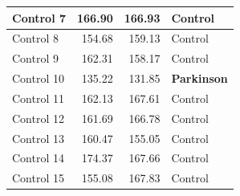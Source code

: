 \documentclass[10pt, conference, compsocconf]{IEEEtran}
\begin{document}
\begin{table}[!h]
\begin{tabular}{|l|l|l|l|}
Control 7         & \multicolumn{1}{r|}{166.90}                                                          & \multicolumn{1}{r|}{166.93}                                                          & Control                                                            \\ \hline
Control 8         & \multicolumn{1}{r|}{154.68}                                                          & \multicolumn{1}{r|}{159.13}                                                          & Control                                                            \\ \hline
Control 9         & \multicolumn{1}{r|}{162.31}                                                          & \multicolumn{1}{r|}{158.17}                                                          & Control                                                            \\ \hline
Control 10         & \multicolumn{1}{r|}{135.22}                                                          & \multicolumn{1}{r|}{131.85}                                                          & \textbf{Parkinson}                                                            \\ \hline
Control 11         & \multicolumn{1}{r|}{162.13}                                                          & \multicolumn{1}{r|}{167.61}                                                          & Control                                                            \\ \hline
Control 12         & \multicolumn{1}{r|}{161.69}                                                          & \multicolumn{1}{r|}{166.78}                                                          & Control                                                            \\ \hline
Control 13         & \multicolumn{1}{r|}{160.47}                                                          & \multicolumn{1}{r|}{155.05}                                                          & Control                                                            \\ \hline
Control 14         & \multicolumn{1}{r|}{174.37}                                                          & \multicolumn{1}{r|}{167.66}                                                          & Control                                                            \\ \hline
Control 15         & \multicolumn{1}{r|}{155.08}                                                          & \multicolumn{1}{r|}{167.83}                                                          & Control                                                            \\ \hline

\end{tabular}
\end{table}
\end{document}
